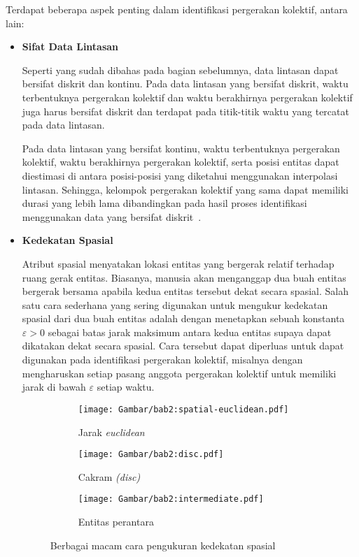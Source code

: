 \noindent Terdapat beberapa aspek penting dalam identifikasi pergerakan kolektif, antara lain:

\begin{itemize}
    \item \textbf{Sifat Data Lintasan}
    
    Seperti yang sudah dibahas pada bagian sebelumnya, data lintasan dapat bersifat diskrit dan kontinu. Pada data lintasan yang bersifat diskrit, waktu terbentuknya pergerakan kolektif dan waktu berakhirnya pergerakan kolektif juga harus bersifat diskrit dan terdapat pada titik-titik waktu yang tercatat pada data lintasan.
    
    Pada data lintasan yang bersifat kontinu, waktu terbentuknya pergerakan kolektif, waktu berakhirnya pergerakan kolektif, serta posisi entitas dapat diestimasi di antara posisi-posisi yang diketahui menggunakan interpolasi lintasan. Sehingga, kelompok pergerakan kolektif yang sama dapat memiliki durasi yang lebih lama dibandingkan pada hasil proses identifikasi menggunakan data yang bersifat diskrit~\cite{wiratma:trajectory}.

    \item \textbf{Kedekatan Spasial}
    
    Atribut spasial menyatakan lokasi entitas yang bergerak relatif terhadap ruang gerak entitas. Biasanya, manusia akan menganggap dua buah entitas bergerak bersama apabila kedua entitas tersebut dekat secara spasial. Salah satu cara sederhana yang sering digunakan untuk mengukur kedekatan spasial dari dua buah entitas adalah dengan menetapkan sebuah konstanta $\varepsilon > 0$ \iffalse \lionov{pake varepsilon ($\varepsilon$)} \fi sebagai batas jarak maksimum antara kedua entitas supaya dapat dikatakan dekat secara spasial. Cara tersebut dapat diperluas untuk dapat digunakan pada identifikasi pergerakan kolektif, misalnya dengan mengharuskan setiap pasang anggota pergerakan kolektif untuk memiliki jarak di bawah $\varepsilon$ setiap waktu.
    
    \begin{figure}[htbp]
        \centering
        \begin{subfigure}[htbp]{0.225\textwidth}
            \centering
            \texttt{[image: Gambar/bab2:spatial-euclidean.pdf]}
            \caption{Jarak \textit{euclidean}}
        \end{subfigure} \hspace{0.5cm}
        \begin{subfigure}[htbp]{0.225\textwidth}
            \centering
            \texttt{[image: Gambar/bab2:disc.pdf]}
            \caption{Cakram \textit{(disc)}}
        \end{subfigure} \hspace{0.5cm}
        \begin{subfigure}[htbp]{0.225\textwidth}
            \centering
            \texttt{[image: Gambar/bab2:intermediate.pdf]}
            \caption{Entitas perantara}
        \end{subfigure}
        \caption[Pengukuran kedekatan spasial]{Berbagai macam cara pengukuran kedekatan spasial}
        \label{bab2:spasial}
    \end{figure}
    

\end{itemize}
